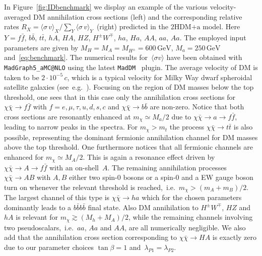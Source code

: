 \documentclass[review]{elsarticle}
\newcommand{\hdma}{\ensuremath{\textrm{2HDM+a}}\xspace}
\begin{document}
In  Figure~\ref{fig:IDbenchmark} we display  an example of the various velocity-averaged DM annihilation cross sections (left) and the corresponding relative rates $R_X = \langle \sigma \, v \rangle_X/\sum_Y \langle \sigma \, v \rangle_Y$~(right) predicted  in the \hdma model. Here $Y =  f \bar f$, $b \bar b$, $t \bar t$,  $hA$, $HA$, $HZ$,  $H^\pm W^\mp$, $ha$, $Ha$, $AA$, $aa$, $Aa$. The employed input parameters are given by $M_H = M_A = M_{H^\pm} = 600 \, {\mathrm{GeV}}$, $M_a = 250 \, {\mathrm{GeV}}$ and~\eqref{eq:benchmark}. The numerical results for~$\langle \sigma v \rangle$ have been obtained with {\tt MadGraph5\_aMC@NLO}  using the latest  {\tt MadDM}~\cite{Ambrogi:2018jqj} plugin.  The average velocity of DM is taken to be $2 \cdot 10^{-5} \, c$, which is a typical velocity for Milky Way dwarf spheroidal satellite galaxies (see~e.g.~\cite{Simon:2007dq,Walker:2008ax}). Focusing on the region of DM masses below the top threshold, one sees that in this case only the annihilation cross sections for $\chi \bar \chi \to f \bar f$ with $f = e, \mu, \tau, u, d, s, c$ and $\chi \bar \chi \to b \bar b$ are non-zero.   Notice that both cross sections are resonantly enhanced at $m_\chi \simeq M_a/2$ due to $\chi \bar \chi \to a \to f \bar f$, leading to narrow peaks in the spectra. For $m_\chi > m_t$ the process $\chi \bar \chi \to t \bar t$ is also possible, representing the dominant fermionic annihilation channel for DM masses above the top threshold. One furthermore notices that all fermionic channels are enhanced for $m_\chi \simeq M_A/2$. This is again a resonance effect driven  by $\chi \bar \chi \to A \to f \bar f$ with an on-shell~$A$. The remaining annihilation processes $\chi \bar \chi \to A B$ with $A,B$ either  two spin-0 bosons or a spin-0 and a EW gauge boson turn on whenever the relevant threshold is reached,~i.e.~$m_\chi > (m_A + m_B)/2$. The largest channel of this type is $\chi \bar \chi \to ha$ which for the chosen parameters dominantly leads to a $b \bar b b \bar b$ final state. Also DM annihilation to  $H^\pm W^\mp$, $HZ$ and $hA$ is relevant for $m_\chi \gtrsim (M_h + M_A)/2$, while the remaining channels involving two pseudoscalars,~i.e.~$aa$, $Aa$ and $AA$, are all numerically negligible. We also add that the annihilation cross section corresponding to $\chi \bar \chi \to HA$ is exactly zero due to our parameter choices  $\tan \beta = 1$ and~$\lambda_{P1} = \lambda_{P2}$.  
\end{document}
